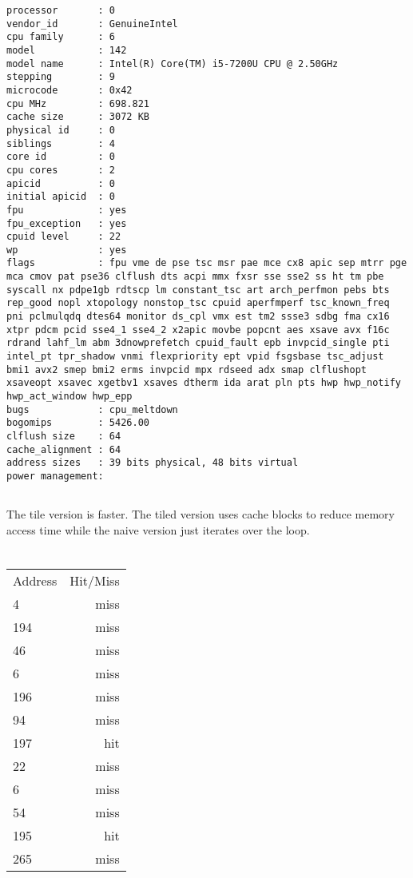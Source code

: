 \documentclass{article}
\begin{document}
\begin{verbatim}
processor       : 0
vendor_id       : GenuineIntel
cpu family      : 6
model           : 142
model name      : Intel(R) Core(TM) i5-7200U CPU @ 2.50GHz
stepping        : 9
microcode       : 0x42
cpu MHz         : 698.821
cache size      : 3072 KB
physical id     : 0
siblings        : 4
core id         : 0
cpu cores       : 2
apicid          : 0
initial apicid  : 0
fpu             : yes
fpu_exception   : yes
cpuid level     : 22
wp              : yes
flags           : fpu vme de pse tsc msr pae mce cx8 apic sep mtrr pge mca cmov pat pse36 clflush dts acpi mmx fxsr sse sse2 ss ht tm pbe syscall nx pdpe1gb rdtscp lm constant_tsc art arch_perfmon pebs bts rep_good nopl xtopology nonstop_tsc cpuid aperfmperf tsc_known_freq pni pclmulqdq dtes64 monitor ds_cpl vmx est tm2 ssse3 sdbg fma cx16 xtpr pdcm pcid sse4_1 sse4_2 x2apic movbe popcnt aes xsave avx f16c rdrand lahf_lm abm 3dnowprefetch cpuid_fault epb invpcid_single pti intel_pt tpr_shadow vnmi flexpriority ept vpid fsgsbase tsc_adjust bmi1 avx2 smep bmi2 erms invpcid mpx rdseed adx smap clflushopt xsaveopt xsavec xgetbv1 xsaves dtherm ida arat pln pts hwp hwp_notify hwp_act_window hwp_epp
bugs            : cpu_meltdown
bogomips        : 5426.00
clflush size    : 64
cache_alignment : 64
address sizes   : 39 bits physical, 48 bits virtual
power management:
\end{verbatim}

\subsection{}
The tile version is faster. The tiled version uses cache blocks to reduce memory access time while the naive version just iterates over the loop.

\section{}

\subsection{}
\begin{tabular}{l | r }
  \hline
  Address & Hit/Miss\\
  4 &  miss \\
  194 &  miss \\
  46 &  miss \\
  6 & miss \\
  196 & miss \\
  94 & miss \\
  197 & hit \\
  22 & miss \\
  6 & miss \\
  54 & miss \\
  195 & hit \\
  265 & miss \\
  \hline  
\end{tabular}
\end{document}

